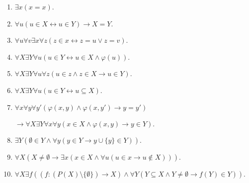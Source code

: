 \documentclass[a4paper,11pt]{article}
\begin{document}
\begin{enumerate}
\item $\exists x(x=x)$.

\item $\forall u(u\in X\leftrightarrow u\in Y)\to X=Y$.

\item $\forall u\forall v\exists x\forall z(z\in x\leftrightarrow z=u\lor z=v)$.

\item $\forall X\exists Y\forall u(u\in Y\leftrightarrow u\in X\land\varphi(u))$.

\item $\forall X\exists Y\forall u\forall z(u\in z\land z\in X\to u\in Y)$.

\item $\forall X\exists Y\forall u(u\in Y\leftrightarrow u\subseteq X)$.
\medskip

\item $\forall x\forall y\forall y'(\varphi(x,y)\land\varphi(x,y')\to y=y')$

$\to\forall X\exists Y\forall x\forall y(x\in X\land\varphi(x,y)\to y\in Y)$.
\medskip

\item $\exists Y(\emptyset\in Y\land\forall y(y\in Y\to y\cup\{y\}\in Y))$.
\medskip

\item $\forall X(X\not=\emptyset\to\exists x(x\in X\land\forall u(u\in x\to u\not\in X)))$.
\medskip

\item $\forall X\exists f((f:(P(X)\setminus\{\emptyset\})\to X)\land\forall Y(Y\subseteq X\land Y\not=\emptyset\to f(Y)\in Y))$.
\end{enumerate}
\end{document}
